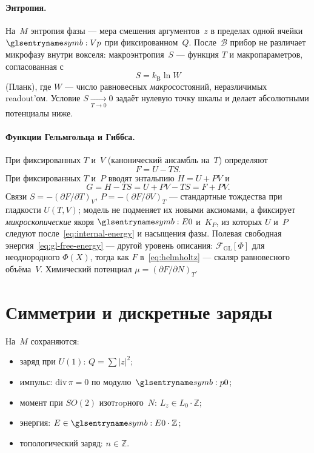\paragraph{Энтропия.}
На~$M$ энтропия фазы --- мера смешения аргументов~$z$
в пределах одной ячейки~$\hv$ при фиксированном~$Q$.
После~$\mathcal{B}$ прибор не различает микрофазу внутри вокселя:
макроэнтропия~$S$ --- функция $T$ и макропараметров, согласованная с
\[
  S = k_{\mathrm{B}}\ln W
\]
(Планк), где $W$ --- число равновесных \emph{макро}состояний, неразличимых readout'ом.
Условие $S\xrightarrow[T\to 0]{}0$ задаёт нулевую точку шкалы и делает
абсолютными потенциалы ниже.

\paragraph{Функции Гельмгольца и Гиббса.}
При фиксированных $T$ и~$V$ (канонический ансамбль на~$T$) определяют
\begin{equation}
\label{eq:helmholtz}
  F = U - TS.
\end{equation}
При фиксированных $T$ и~$P$ вводят энтальпию $H=U+PV$ и
\begin{equation}
\label{eq:gibbs}
  G = H - TS = U + PV - TS = F + PV.
\end{equation}
Связи $S=-(\partial F/\partial T)_V$, $P=-(\partial F/\partial V)_T$ --- стандартные
тождества при гладкости $U(T,V)$; модель не подменяет их новыми аксиомами,
а фиксирует \emph{микроскопические} якоря $\ladderEnergy$ и~$K_P$, из которых $U$ и~$P$
следуют после~\eqref{eq:internal-energy} и насыщения фазы.
Полевая свободная энергия~\eqref{eq:gl-free-energy} --- другой уровень описания:
$\mathcal{F}_{\mathrm{GL}}[\Phi]$ для неоднородного $\Phi(X)$, тогда как $F$ в~\eqref{eq:helmholtz}
--- скаляр равновесного объёма~$V$.
Химический потенциал $\mu=(\partial F/\partial N)_T$.

\section{Симметрии и дискретные заряды}

\begin{proposition}
На~$M$ сохраняются:
\begin{itemize}
\item заряд при $U(1)$: $Q=\sum|z|^2$;
\item импульс: $\mathrm{div}\,\pi=0$ по модулю~$\ladderMomentum$;
\item момент при $SO(2)$ изотropного~$N$: $L_z\in L_0\cdot\mathbb{Z}$;
\item энергия: $E\in \ladderEnergy\cdot\mathbb{Z}$;
\item топологический заряд: $n\in\mathbb{Z}$.
\end{itemize}
\end{proposition}

